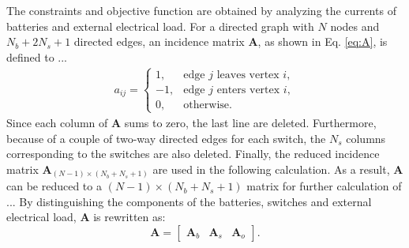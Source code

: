 \documentclass{article}
\begin{document}
The constraints and objective function are obtained by analyzing the currents of batteries and external electrical load.
For a directed graph with $N$ nodes and $N_b+2N_s+1$ directed edges, an incidence matrix $\bm{A}$, as shown in Eq. \ref{eq:A}, is defined to ... %
\begin{align}\label{eq:A}
    a_{ij}=
    \begin{cases}
        1,  & \text{edge $j$ leaves vertex $i$},\\
        -1, & \text{edge $j$ enters vertex $i$},\\
        0,  & \text{otherwise}.
    \end{cases}
\end{align}
Since each column of $\bm{A}$ sums to zero, the last line are deleted.
Furthermore, because of a couple of two-way directed edges for each switch, the $N_s$ columns corresponding to the switches are also deleted. %
Finally, the reduced incidence matrix $\bm{A}_{(N-1)\times(N_b+N_s+1)}$ are used in the following calculation.
As a result, $\bm{A}$ can be reduced to a $(N-1)\times(N_b+N_s+1)$ matrix for further calculation of ... %
By distinguishing the components of the batteries, switches and external electrical load, $\bm{A}$ is rewritten as:
\begin{equation}
    \bm{A} =
    \begin{bmatrix}
        \bm{A}_b & \bm{A}_s & \bm{A}_o
    \end{bmatrix}.
\end{equation}
\end{document}
